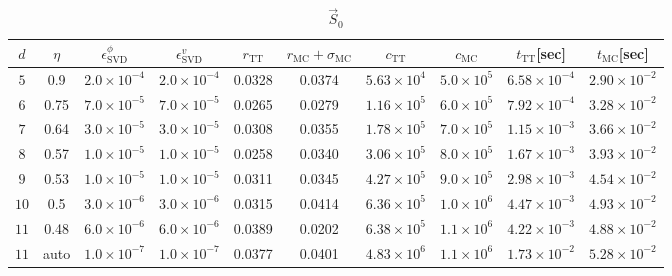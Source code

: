 \begin{table*}[htbp]
\begin{subtable}[h]{0.9\textwidth}
\centering
\caption{$\vec{S}_0$}
\begin{tabular}{|c|c|c|c|c|c|c|c|c|c|}
    \hline
    $d$ & $\eta$ & $\epsilon_{\mathrm{SVD}}^\phi$ & $\epsilon_{\mathrm{SVD}}^v$ & $r_{\mathrm{TT}}$ & $r_{\mathrm{MC}} + \sigma_{\text{MC}}$ & {$c_{\mathrm{TT}}$} & {$c_{\mathrm{MC}}$} & {$t_{\mathrm{TT}}$[sec]} & {$t_{\mathrm{MC}}$[sec]}  \\
    \hline
    $5$ & 0.9 & $2.0 \times 10^{-4}$ & $2.0 \times 10^{-4}$ & 0.0328 & 0.0374 & $5.63 \times 10^4$ & $5.0 \times 10^5$ & $6.58 \times 10^{-4}$ & $2.90 \times 10^{-2}$ \\
    \hline
    $6$ & 0.75 & $7.0 \times 10^{-5}$ & $7.0 \times 10^{-5}$ & 0.0265 & 0.0279 & $1.16 \times 10^5$ & $6.0 \times 10^5$ & $7.92 \times 10^{-4}$ & $3.28 \times 10^{-2}$ \\
    \hline
    $7$ & 0.64 & $3.0 \times 10^{-5}$ & $3.0 \times 10^{-5}$ & 0.0308 & 0.0355 & $1.78 \times 10^5$ & $7.0 \times 10^5$ & $1.15 \times 10^{-3}$ & $3.66 \times 10^{-2}$ \\
    \hline
    $8$ & 0.57 & $1.0 \times 10^{-5}$ & $1.0 \times 10^{-5}$ & 0.0258 & 0.0340 & $3.06 \times 10^5$ & $8.0 \times 10^5$ & $1.67 \times 10^{-3}$ & $3.93 \times 10^{-2}$ \\
    \hline
    $9$ & 0.53 & $1.0 \times 10^{-5}$ & $1.0 \times 10^{-5}$ & 0.0311 & 0.0345 & $4.27 \times 10^5$ & $9.0 \times 10^5$ & $2.98 \times 10^{-3}$ & $4.54 \times 10^{-2}$ \\
    \hline
    $10$ & 0.5 & $3.0 \times 10^{-6}$ & $3.0 \times 10^{-6}$ & 0.0315 & 0.0414 & $6.36 \times 10^5$ & $1.0 \times 10^6$ & $4.47 \times 10^{-3}$ & $4.93 \times 10^{-2}$ \\
    \hline
    $11$ & 0.48 & $6.0 \times 10^{-6}$ & $6.0 \times 10^{-6}$ & 0.0389 & 0.0202 & $6.38 \times 10^5$ & $1.1 \times 10^6$ & $4.22 \times 10^{-3}$ & $4.88 \times 10^{-2}$ \\
    \hline
    $11$ & auto & $1.0 \times 10^{-7}$ & $1.0 \times 10^{-7}$ & 0.0377 & 0.0401 & $4.83 \times 10^6$ & $1.1 \times 10^6$ & $1.73 \times 10^{-2}$ & $5.28 \times 10^{-2}$ \\
    \hline
\end{tabular}
\end{subtable}


\end{table*}
